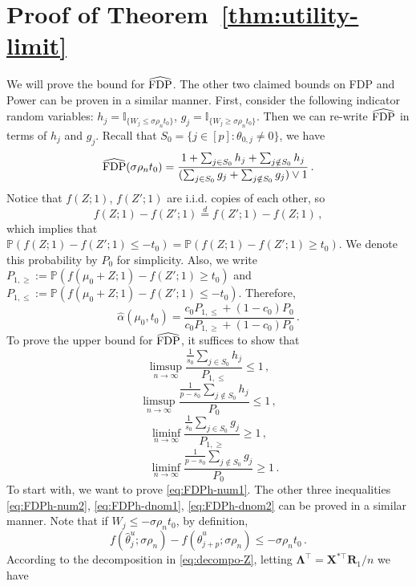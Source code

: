 \documentclass[11pt]{article}
\newcommand{\bX}{\boldsymbol{X}}
\newcommand{\bR}{\boldsymbol{R}}
\newcommand{\bLambda}{\boldsymbol{\Lambda}}
\newcommand{\FDP}{{\rm FDP}}
\newcommand{\Prob}{\mathbb{P}}
\newcommand{\hth}{\widehat{\theta}}
\begin{document}
\section{Proof of Theorem~\ref{thm:utility-limit}}\label{pf:utility-limit}
We will prove the bound for $\widehat{\FDP}$. The other two claimed bounds on FDP and Power can be proven in a similar manner. First, consider the following indicator random variables:
$ h_j = \mathbb I_{\{W_j\leq \sigma\rho_nt_0\}}$, $ g_j= \mathbb I_{\{W_j\geq \sigma\rho_nt_0\}}$. Then we can re-write $\widehat{\FDP}$ in terms of $h_j$ and $g_j$. Recall that $S_0 =\{j\in[p]:\theta_{0,j}\neq0\}$, we have
\[
\widehat{\FDP}(\sigma\rho_nt_0) = \frac{1+\sum_{j\in S_0}h_j+\sum_{j\notin S_0}h_j}{(\sum_{j\in S_0}g_j+\sum_{j\notin S_0}g_j)\vee 1}\,.
\]
Notice that $f(Z;1)$, $f(Z';1)$ are i.i.d. copies of each other, so
\[
f(Z;1)-f(Z';1)\stackrel{d}{=}f(Z';1)-f(Z;1)\,,
\]
which implies that $\Prob(f(Z;1)-f(Z';1)\leq-t_0)=\Prob(f(Z;1)-f(Z';1)\geq t_0)$. We denote this probability by $P_0$ for simplicity. Also, we write $P_{1,\geq} := \Prob(f(\mu_0+Z;1)-f(Z';1)\geq t_0)$ and $P_{1,\leq} := \Prob(f(\mu_0+Z;1)-f(Z';1)\leq -t_0)$. Therefore,
\[
\widehat{\alpha}(\mu_0,t_0) = \frac{c_0P_{1,\leq}+(1-c_0)P_0}{c_0P_{1,\geq}+(1-c_0)P_0}\,.
\]
To prove the upper bound for $\widehat{\FDP}$, it suffices to show that
\begin{equation}\label{eq:FDPh-num1}
    \limsup_{n\to\infty}\frac{\frac{1}{s_0}\sum_{j\in S_0}h_j}{P_{1,\leq}}\leq 1\,,
\end{equation}
\begin{equation}\label{eq:FDPh-num2}
    \limsup_{n\to\infty}\frac{\frac{1}{p-s_0}\sum_{j\notin S_0}h_j}{P_0}\leq 1\,,
\end{equation}
\begin{equation}\label{eq:FDPh-dnom1}
    \liminf_{n\to\infty}\frac{\frac{1}{s_0}\sum_{j\in S_0}g_j}{P_{1,\geq}}\geq 1\,,
\end{equation}
\begin{equation}\label{eq:FDPh-dnom2}
    \quad \liminf_{n\to\infty}\frac{\frac{1}{p-s_0}\sum_{j\notin S_0}g_j}{P_0}\geq 1\,.
\end{equation}
To start with, we want to prove \eqref{eq:FDPh-num1}. The other three inequalities \eqref{eq:FDPh-num2}, \eqref{eq:FDPh-dnom1}, \eqref{eq:FDPh-dnom2} can be proved in a similar manner. Note that if $W_j\leq-\sigma\rho_nt_0$, by definition,
\[
f(\hth^u_j;\sigma\rho_n)-f(\hth^u_{j+p};\sigma\rho_n)\leq -\sigma\rho_nt_0\,.
\]
According to the decomposition in \eqref{eq:decompo-Z}, letting $\bLambda^\top = \bX^{*\top}\bR_1/n$ we have
\end{document}
